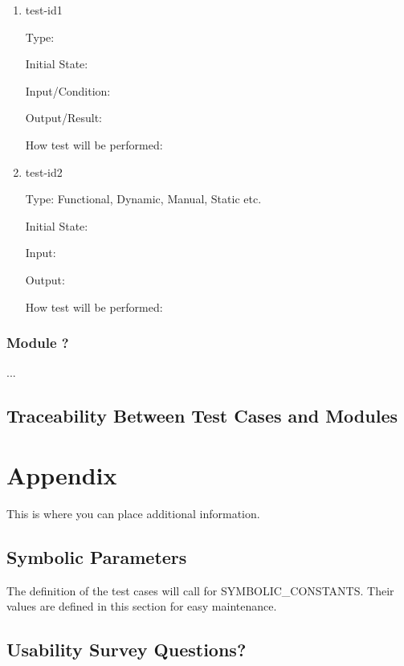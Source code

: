 \documentclass[12pt, titlepage]{article}
\begin{document}
\begin{enumerate}

\item{test-id1\\}

Type: 
					
Initial State: 
					
Input/Condition: 
					
Output/Result: 
					
How test will be performed: 
					
\item{test-id2\\}

Type: Functional, Dynamic, Manual, Static etc.
					
Initial State: 
					
Input: 
					
Output: 
					
How test will be performed: 

\end{enumerate}

\subsubsection{Module ?}

...

\subsection{Traceability Between Test Cases and Modules}

				




\newpage

\section{Appendix}

This is where you can place additional information.

\subsection{Symbolic Parameters}

The definition of the test cases will call for SYMBOLIC\_CONSTANTS.
Their values are defined in this section for easy maintenance.

\subsection{Usability Survey Questions?}

\end{document}
